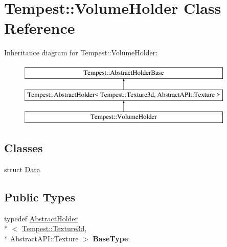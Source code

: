 \hypertarget{class_tempest_1_1_volume_holder}{\section{Tempest\+:\+:Volume\+Holder Class Reference}
\label{class_tempest_1_1_volume_holder}
}
Inheritance diagram for Tempest\+:\+:Volume\+Holder\+:\begin{figure}[H]
\begin{center}
\leavevmode
\includegraphics[height=3.000000cm]{class_tempest_1_1_volume_holder}
\end{center}
\end{figure}
\subsection*{Classes}
\begin{DoxyCompactItemize}
\item 
struct \hyperlink{struct_volume_holder_1_1_data}{Data}
\end{DoxyCompactItemize}
\subsection*{Public Types}
\begin{DoxyCompactItemize}
\item 
\hypertarget{class_tempest_1_1_volume_holder_ac08f48cc005372e6b729abb7b5e0cf6a}{typedef \hyperlink{class_tempest_1_1_abstract_holder}{Abstract\+Holder}\\*
$<$ \hyperlink{class_tempest_1_1_texture3d}{Tempest\+::\+Texture3d}, \\*
Abstract\+A\+P\+I\+::\+Texture $>$ {\bfseries Base\+Type}}\label{class_tempest_1_1_volume_holder_ac08f48cc005372e6b729abb7b5e0cf6a}

\end{DoxyCompactItemize}
